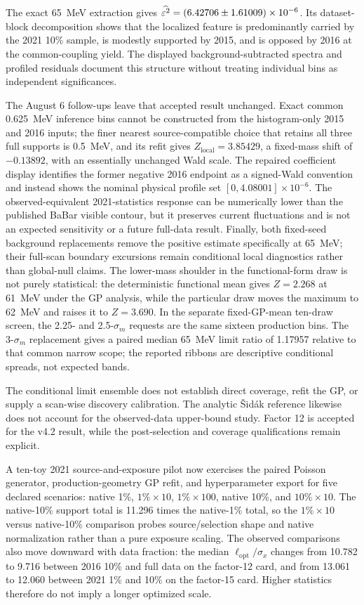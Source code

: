 The exact 65~MeV extraction gives
$\widehat{\varepsilon^2}=(6.42706\pm1.61009)\times10^{-6}$. Its dataset-block
decomposition shows that the localized feature is predominantly carried by the
2021 10\% sample, is modestly supported by 2015, and is opposed by 2016 at the
common-coupling yield. The displayed background-subtracted spectra and profiled
residuals document this structure without treating individual bins as independent
significances.

The August 6 follow-ups leave that accepted result unchanged.  Exact common
0.625~MeV inference bins cannot be constructed from the histogram-only 2015 and
2016 inputs; the finer nearest source-compatible choice that retains all three
full supports is 0.5~MeV, and its refit gives
$Z_{\mathrm{local}}=3.85429$, a fixed-mass shift of $-0.13892$, with an
essentially unchanged Wald scale.  The repaired coefficient display identifies
the former negative 2016 endpoint as a signed-Wald convention and instead shows
the nominal physical profile set $[0,4.08001]\times10^{-6}$.  The
observed-equivalent 2021-statistics response can be numerically lower than the
published BaBar visible contour, but it preserves current fluctuations and is
not an expected sensitivity or a future full-data result.  Finally, both
fixed-seed background replacements remove the positive estimate specifically
at 65~MeV; their full-scan boundary excursions remain conditional local
diagnostics rather than global-null claims.  The lower-mass shoulder in the
functional-form draw is not purely statistical: the deterministic functional
mean gives $Z=2.268$ at 61~MeV under the GP analysis, while the particular
draw moves the maximum to 62~MeV and raises it to $Z=3.690$.  In the separate
fixed-GP-mean ten-draw screen, the 2.25- and 2.5-$\sigma_m$ requests are the
same sixteen production bins.  The 3-$\sigma_m$ replacement gives a paired
median 65~MeV limit ratio of 1.17957 relative to that common narrow scope; the
reported ribbons are descriptive conditional spreads, not expected bands.

The conditional limit ensemble does not establish direct \CLs{} coverage, refit
the GP, or supply a scan-wise discovery calibration. The analytic \v{S}id\'ak
reference likewise does not account for the observed-data upper-bound study.
Factor 12 is accepted for the v4.2 result, while the post-selection and coverage
qualifications remain explicit.

A ten-toy 2021 source-and-exposure pilot now exercises the paired Poisson generator,
production-geometry GP refit, and hyperparameter export for five declared scenarios:
native 1\%, $1\%\times10$, $1\%\times100$, native 10\%, and $10\%\times10$.
The native-10\% support total is 11.296 times the native-1\% total, so the
$1\%\times10$ versus native-10\% comparison probes source/selection shape and native
normalization rather than a pure exposure scaling. The observed comparisons also move
downward with data fraction: the median $\ell_{\mathrm{opt}}/\sigma_x$ changes from
10.782 to 9.716 between 2016 10\% and full data on the factor-12 card, and from
13.061 to 12.060 between 2021 1\% and 10\% on the factor-15 card. Higher statistics
therefore do not imply a longer optimized scale.

